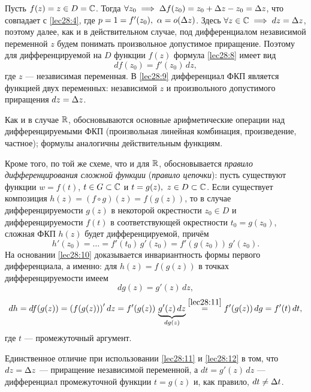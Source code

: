 \documentclass[../../main.tex]{subfiles}
\begin{document}
\begin{exmp}
Пусть $f(z) = z \in D = \mathbb{C}$. Тогда $\forall z_0 \implies
\Delta f(z_0) = z_0 + \Delta z - z_0 = \Delta z$, что совпадает с \eqref{lec28:4},
где $p = 1 = f'(z_0),\ \alpha = o(\Delta z)$.
Здесь $\forall z \in \mathbb{C} \implies dz = \Delta z$,
поэтому далее, как и в действительном случае, под дифференциалом
независимой переменной $z$ будем понимать произвольное допустимое приращение.
Поэтому для дифференцируемой на $D$ функции $f(z)$ формула \eqref{lec28:8} 
имеет вид
\begin{equation}
\label{lec28:9}
d f(z_0) = f'(z_0)\, dz,
\end{equation}
где $z$ --- независимая переменная.
В \eqref{lec28:9} дифференциал ФКП является функцией двух переменных:
независимой $z$ и произвольного допустимого приращения $dz = \Delta z$.
\end{exmp}

Как и в случае $\mathbb{R}$, обосновываются основные арифметические операции над
дифференцируемыми ФКП (произвольная линейная комбинация, произведение, 
частное);
формулы аналогичны действительным функциям.

Кроме того, по той же схеме, что и для $\mathbb{R}$, обосновывается \emph{правило
дифференцирования сложной функции} (\emph{правило цепочки}):
пусть существуют функции $w = f(t)$, $t \in G \subset \mathbb{C}$ и
$t = g(z),\ z \in D \subset \mathbb{C}$.
Если существует композиция $h(z) = \left(f \circ g\right) (z) =
f(g(z))$, то в случае дифференцируемости $g(z)$
в некоторой окрестности $z_0 \in D$ и дифференцируемости $f(t)$ в 
соответствующей окрестности $t_0 = g(z_0)$, сложная ФКП $h(z)$ будет
дифференцируемой, причём
\begin{equation}
\label{lec28:10}
h'(z_0) = \ldots = f'(t_0)\, g'(z_0) = f'(g(z_0))\, g'(z_0).
\end{equation}
На основании \eqref{lec28:10} доказывается инвариантность формы
первого дифференциала, а именно: для $h(z) = f(g(z))$ в точках 
дифференцируемости
имеем
\begin{equation}
\label{lec28:11}
d g(z) = g'(z)\, dz,
\end{equation}
\begin{equation}
\label{lec28:12}
dh = d f(g(z)) = \left(f(g(z))\right)' dz = f'(g(z))\,
\underbrace{g'(z)\, dz}_{d g(z)} \stk{lec28:11}{=} f'(g(z))\, dg = f'(t)\, dt,
\end{equation}
где $t$ --- промежуточный аргумент.

Единственное отличие при использовании \eqref{lec28:11} и \eqref{lec28:12}
в том, что $dz = \Delta z$ --- приращение независимой переменной,
а $dt = g'(z)\, dz$ --- дифференциал промежуточной функции $t = g(z)$ и,
как правило, $dt \ne \Delta t$.
\end{document}
